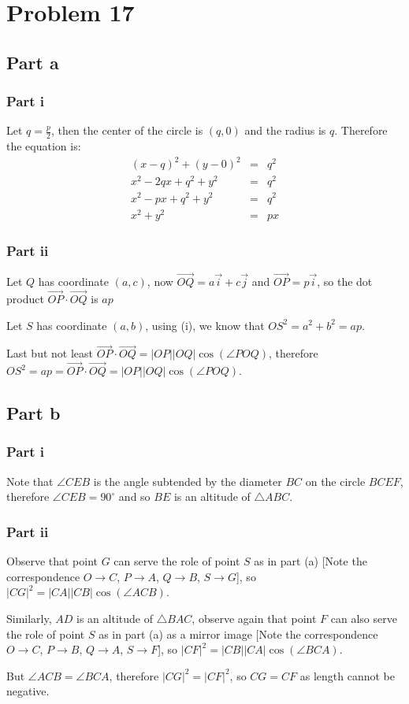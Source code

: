\section*{Problem 17}
\subsection*{Part a}
\subsubsection*{Part i}
Let $ q = \frac{p}{2} $, then the center of the circle is $ (q,0) $ and the radius is $ q $. Therefore the equation is:
\begin{eqnarray*}
    (x-q)^2 + (y - 0)^2 &=& q^2 \\
  x^2 - 2qx + q^2 + y^2 &=& q^2 \\
   x^2 - px + q^2 + y^2 &=& q^2 \\
              x^2 + y^2 &=& px
\end{eqnarray*}

\subsubsection*{Part ii}
Let $ Q $ has coordinate $ (a,c) $, now $ \vec{OQ} = a\vec{i} + c\vec{j} $ and $ \vec{OP} = p\vec{i} $, so the dot product $ \vec{OP} \cdot \vec{OQ} $ is $ ap $

Let $ S $ has coordinate $ (a,b) $, using (i), we know that $ OS^2 = a^2 + b^2 = ap $.

Last but not least $ \vec{OP} \cdot \vec{OQ} = |OP| |OQ| \cos(\angle POQ) $, therefore $ OS^2 = ap = \vec{OP} \cdot \vec{OQ} = |OP| |OQ| \cos(\angle POQ) $.

\subsection*{Part b}
\subsubsection*{Part i}
Note that $ \angle CEB $ is the angle subtended by the diameter $ BC $ on the circle $ BCEF $, therefore $ \angle CEB = 90^\circ $ and so $ BE $ is an altitude of $ \triangle ABC $.

\subsubsection*{Part ii}
Observe that point $ G $ can serve the role of point $ S $ as in part (a) [Note the correspondence $ O \to C $, $ P \to A $, $ Q \to B $, $ S \to G $], so $ |CG|^2 = |CA| |CB| \cos(\angle ACB) $.

Similarly, $ AD $ is an altitude of $ \triangle BAC $, observe again that point $ F $ can also serve the role of point $ S $ as in part (a) as a mirror image [Note the correspondence $ O \to C $, $ P \to B $, $ Q \to A $, $ S \to F $], so $ |CF|^2 = |CB| |CA| \cos(\angle BCA) $.

But $ \angle ACB = \angle BCA $, therefore $ |CG|^2 = |CF|^2 $, so $ CG = CF $ as length cannot be negative.
